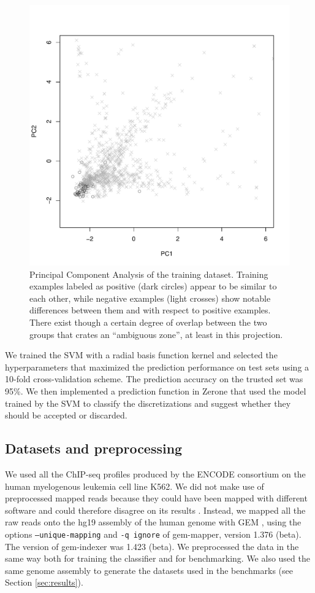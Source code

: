 \documentclass{bioinfo}
\begin{document}
\begin{methods}
\begin{figure}[!tpb]
\centerline{\includegraphics[scale=0.5]{pca.pdf}}
\caption{Principal Component Analysis of the training dataset.
Training examples labeled as positive (dark circles) appear to be similar to
each other, while negative examples (light crosses) show notable differences
between them and with respect to positive examples. There exist though a
certain degree of overlap between the two groups that crates an
``ambiguous zone'', at least in this projection.
}\label{fig:pca}
\end{figure}

We trained the SVM with a radial basis function kernel and
selected the hyperparameters that maximized the prediction
performance on test sets using a 10-fold cross-validation scheme.
The prediction accuracy on the trusted set was 95\%.
We then implemented a prediction function in Zerone that used the
model trained by the SVM to classify the discretizations and
suggest whether they should be accepted or discarded.

\subsection{Datasets and preprocessing}
We used all the ChIP-seq profiles produced by the ENCODE consortium
on the human myelogenous leukemia cell line K562. We did not make use
of preprocessed mapped reads because they could have been mapped with
different software and could therefore disagree on its results
\citep{pmid21059603}. Instead, we mapped all the raw reads onto the
hg19 assembly of the human genome with GEM \citep{pmid23103880}, using
the options \texttt{--unique-mapping} and \texttt{-q ignore} of gem-mapper,
version 1.376 (beta). The version of gem-indexer was 1.423 (beta). We
preprocessed the data in the same way both for training the classifier
and for benchmarking. We also used the same genome assembly to generate
the datasets used in the benchmarks (see Section \ref{sec:results}).


\end{methods}
\end{document}
